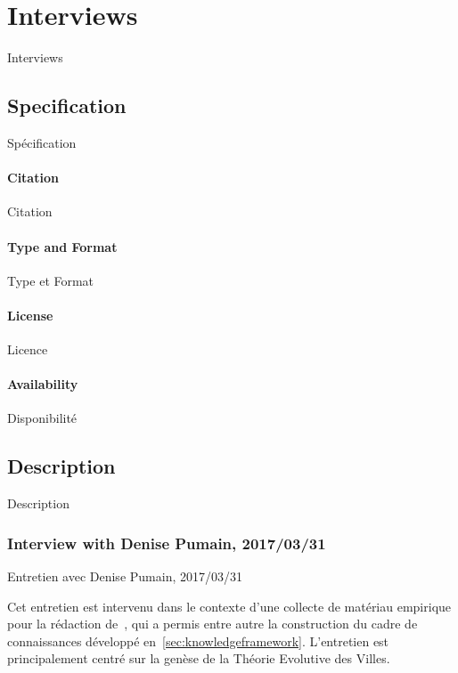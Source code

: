 \section{Interviews}{Interviews}

\label{app:sec:interviews}


\subsection{Specification}{Spécification}

\paragraph{Citation}{Citation}

\paragraph{Type and Format}{Type et Format}

\paragraph{License}{Licence}

\paragraph{Availability}{Disponibilité}


\subsection{Description}{Description}

\subsubsection{Interview with Denise Pumain, 2017/03/31}{Entretien avec Denise Pumain, 2017/03/31}

Cet entretien est intervenu dans le contexte d'une collecte de matériau empirique pour la rédaction de~\cite{raimbault2017applied}, qui a permis entre autre la construction du cadre de connaissances développé en~\ref{sec:knowledgeframework}. L'entretien est principalement centré sur la genèse de la Théorie Evolutive des Villes.

